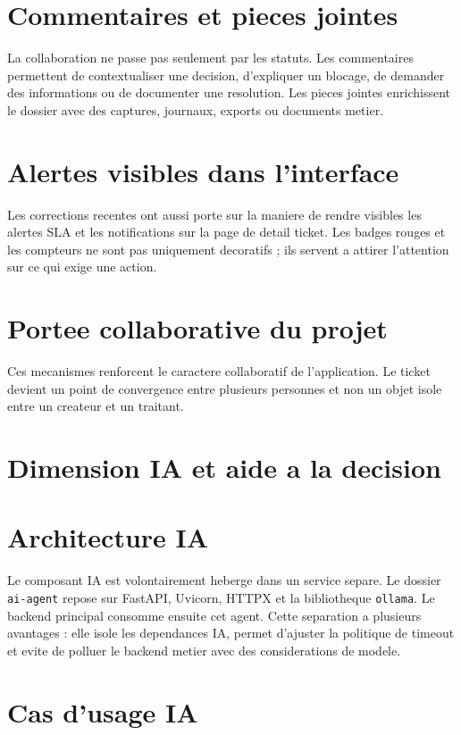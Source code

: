 \section{Commentaires et pieces jointes}

La collaboration ne passe pas seulement par les statuts. Les commentaires permettent de contextualiser une decision, d'expliquer un blocage, de demander des informations ou de documenter une resolution. Les pieces jointes enrichissent le dossier avec des captures, journaux, exports ou documents metier.

\section{Alertes visibles dans l'interface}

Les corrections recentes ont aussi porte sur la maniere de rendre visibles les alertes SLA et les notifications sur la page de detail ticket. Les badges rouges et les compteurs ne sont pas uniquement decoratifs ; ils servent a attirer l'attention sur ce qui exige une action.

\section{Portee collaborative du projet}

Ces mecanismes renforcent le caractere collaboratif de l'application. Le ticket devient un point de convergence entre plusieurs personnes et non un objet isole entre un createur et un traitant.



\section{Dimension IA et aide a la decision}

\section{Architecture IA}

Le composant IA est volontairement heberge dans un service separe. Le dossier \texttt{ai-agent} repose sur FastAPI, Uvicorn, HTTPX et la bibliotheque \texttt{ollama}. Le backend principal consomme ensuite cet agent. Cette separation a plusieurs avantages : elle isole les dependances IA, permet d'ajuster la politique de timeout et evite de polluer le backend metier avec des considerations de modele.

\section{Cas d'usage IA}

